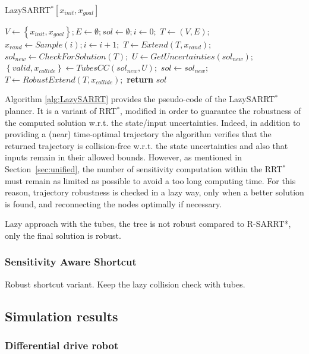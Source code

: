 \begin{algorithm}[htp]
    \caption{LazySARRT$^* [x_{init}, x_{goal}]$}\label{alg:LazySARRT}
    \begin{algorithmic}[1]
        \State $V \gets \left \{ x_{init}, x_{goal} \right \}; E \gets \emptyset; sol \gets \emptyset; i \gets 0;$
            \State $T \gets (V,E);$
            \State $x_{rand} \gets Sample(i); i \gets i+1;$
            \State $T \gets Extend(T, x_{rand});$
            \State $sol_{new} \gets CheckForSolution(T);$
                \State $U \gets GetUncertainties(sol_{new});$
                \State $\left \{ valid, x_{collide} \right \} \gets TubesCC(sol_{new}, U);$
                    \State $sol\gets sol_{new};$
                \Else
                    \State $T \gets RobustExtend(T,x_{collide});$
                \EndIf
            \EndIf
        \EndWhile
        \State \textbf{return} $sol$
    \end{algorithmic}
\end{algorithm}

Algorithm \ref{alg:LazySARRT} provides the pseudo-code of the LazySARRT$^*$ planner.  
It is a variant of RRT$^*$, modified in order to guarantee the robustness of the computed solution w.r.t. the state/input uncertainties.
Indeed, in addition to providing a (near) time-optimal trajectory the algorithm verifies that the returned trajectory is collision-free w.r.t. the state uncertainties and also that inputs remain in their allowed bounds.
However, as mentioned in Section~\ref{sec:unified}, the number of sensitivity computation within the RRT$^*$ must remain as limited as possible to avoid a too long computing time. 
For this reason, trajectory robustness is checked in a lazy way, only when a better solution is found, and reconnecting the nodes optimally if necessary.

Lazy approach with the tubes, the tree is not robust compared to R-SARRT*, only the final solution is robust.
\subsubsection{Sensitivity Aware Shortcut}
Robust shortcut variant.
Keep the lazy collision check with tubes.

\subsection{Simulation results}
\subsubsection{Differential drive robot}
